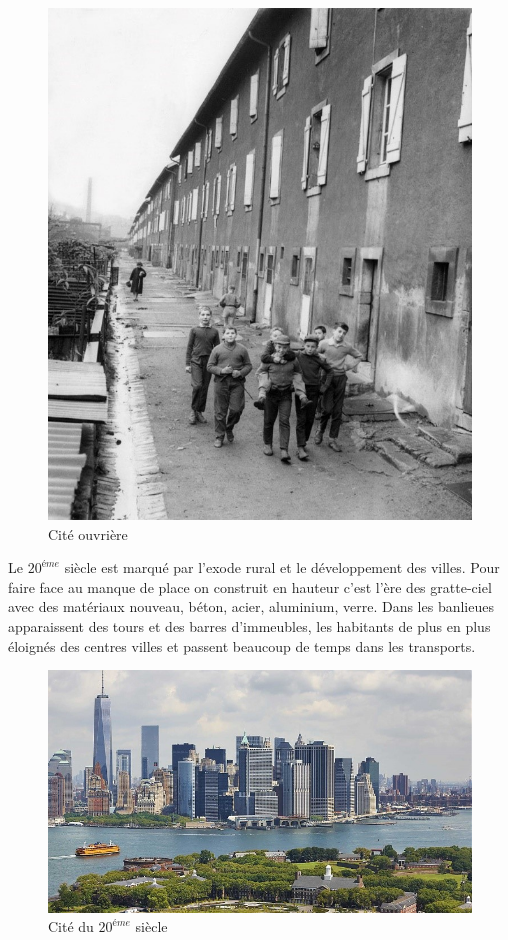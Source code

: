 \begin{figure}[H]
    \centering
    \includegraphics[scale=1]{chap1/chap37.jpg}
   \caption{Cité ouvrière}
    \label{chap36}
\end{figure}

Le $20^{éme}$ siècle est marqué par l'exode rural et le développement des villes. Pour faire face au manque de place on construit en hauteur c'est l'ère des gratte-ciel avec des matériaux nouveau, béton,  acier, aluminium, verre. Dans les banlieues apparaissent des tours et des barres d'immeubles, les habitants de plus en plus éloignés des centres villes et passent beaucoup de temps dans les transports.

\begin{figure}[H]
    \centering
    \includegraphics[scale=0.5]{chap1/chap38.jpg}
   \caption{Cité du $20^{éme}$ siècle}
    \label{chap36}
\end{figure}


